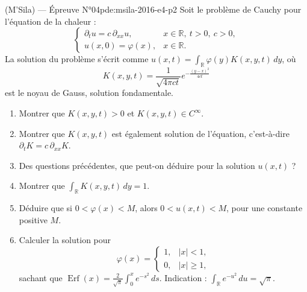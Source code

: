 \begin{problem}{(M'Sila) — Épreuve N°04}{pde:msila-2016-e4-p2}
Soit le problème de Cauchy pour l'équation de la chaleur :
$$\begin{cases}\partial_tu=c\,\partial_{xx}u, & x\in\mathbb{R},\ t>0,\ c>0,\\ u(x,0)=\varphi(x), & x\in\mathbb{R}.\end{cases}$$
La solution du problème s'écrit comme $u(x,t)=\int_{\mathbb{R}}\varphi(y)K(x,y,t)\,dy$, où
$$K(x,y,t)=\frac{1}{\sqrt{4\pi ct}}e^{-\frac{(y-x)^2}{4ct}}$$
est le noyau de Gauss, solution fondamentale.
\begin{enumerate}\item Montrer que $K(x,y,t)>0$ et $K(x,y,t)\in C^\infty$.\item Montrer que $K(x,y,t)$ est également solution de l'équation, c'est-à-dire $\partial_tK=c\,\partial_{xx}K$.\item Des questions précédentes, que peut-on déduire pour la solution $u(x,t)$ ?\item Montrer que $\int_{\mathbb{R}}K(x,y,t)\,dy=1$.\item Déduire que si $0<\varphi(x)<M$, alors $0<u(x,t)<M$, pour une constante positive $M$.\item Calculer la solution pour
$$\varphi(x)=\begin{cases}1, & \lvert x\rvert<1,\\ 0, & \lvert x\rvert\geq1,\end{cases}$$
sachant que $\operatorname{Erf}(x)=\frac{2}{\sqrt{\pi}}\int_0^xe^{-s^2}\,ds$. Indication : $\int_{\mathbb{R}}e^{-u^2}\,du=\sqrt{\pi}$.\end{enumerate}
\end{problem}
\newpage

